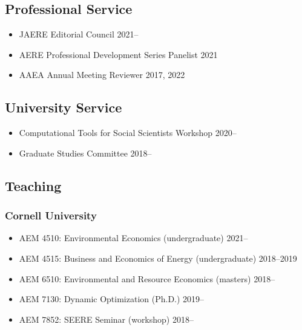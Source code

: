 \documentclass[12pt]{res} %
\begin{document}
\begin{resume}
\vspace{-.2in}

\subsection{Professional Service}
\begin{itemize} \itemsep -1pt
	\item[] JAERE Editorial Council \hfill 2021--
	\item[]	AERE Professional Development Series Panelist \hfill 2021
	\item[] AAEA Annual Meeting Reviewer \hfill 2017, 2022
\end{itemize}


\vspace{-.2in}

\subsection{University Service}
\begin{itemize} \itemsep -1pt
	\item[] Computational Tools for Social Scientists Workshop \hfill 2020--
	\item[]	Graduate Studies Committee \hfill 2018--
\end{itemize}

\vspace{-.2in}

\subsection{Teaching}\vspace{-.2in}
\subsubsection{Cornell University}
\begin{itemize} \itemsep -1pt
	\item[] AEM 4510: Environmental Economics (undergraduate) \hfill 2021--
	\item[] AEM 4515: Business and Economics of Energy (undergraduate) \hfill 2018--2019
	\item[] AEM 6510: Environmental and Resource Economics (masters) \hfill 2018--
	\item[] AEM 7130: Dynamic Optimization (Ph.D.) \hfill 2019--
	\item[] AEM 7852: SEERE Seminar (workshop) \hfill 2018--
\end{itemize}\vspace{-.4in}

\end{resume}
\end{document}
